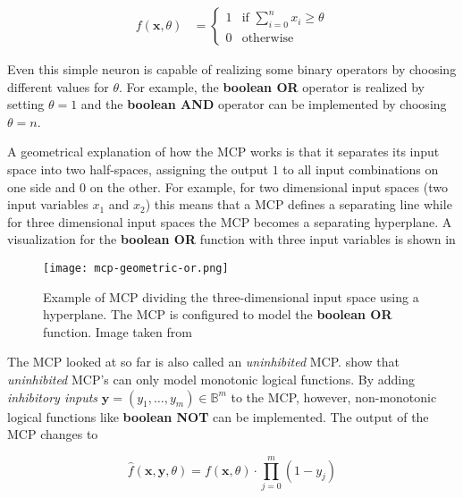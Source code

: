 \begin{equation}
    \begin{split}
        \label{eq:mcculloch-binary}
        f(\bm{x}, \theta)
        &=
        \begin{cases}
            1 & \text{if } \sum_{i=0}^n x_i \geq \theta \\
            0 & \text{otherwise}
        \end{cases}
    \end{split}
\end{equation}

Even this simple neuron is capable of realizing some binary operators by choosing different values for $\theta$.
For example, the \textbf{boolean OR} operator is realized by setting $\theta = 1$ and the \textbf{boolean AND} operator can be implemented by choosing $\theta = n$.

A geometrical explanation of how the MCP works is that it separates its input space into two half-spaces, assigning the output $1$ to all input combinations on one side and $0$ on the other.
For example, for two dimensional input spaces (two input variables $x_1$ and $x_2$) this means that a MCP defines a separating line while for three dimensional input spaces the MCP becomes a separating hyperplane.
A visualization for the \textbf{boolean OR} function with three input variables is shown in 

\begin{figure}[htb!]
    \centering
    \texttt{[image: mcp-geometric-or.png]}
    \caption{Example of MCP dividing the three-dimensional input space using a hyperplane. The MCP is configured to model the \textbf{boolean OR} function. Image taken from \cite{rojas_neural_1996}}
    \label{fig:mcp-geometric-or}
\end{figure}

The MCP looked at so far is also called an \textit{uninhibited} MCP.
\cite{rojas_neural_1996} show that \textit{uninhibited} MCP's can only model monotonic logical functions.
By adding \textit{inhibitory inputs} $\bm{y} = (y_1, \dots, y_m) \in \mathbb{B}^m$ to the MCP, however, non-monotonic logical functions like \textbf{boolean NOT} can be implemented.
The output of the MCP changes to

\begin{equation}
    \hat{f}(\bm{x}, \bm{y}, \theta) = f(\bm{x}, \theta) \cdot \prod_{j = 0}^m (1 - y_j)
\end{equation}

